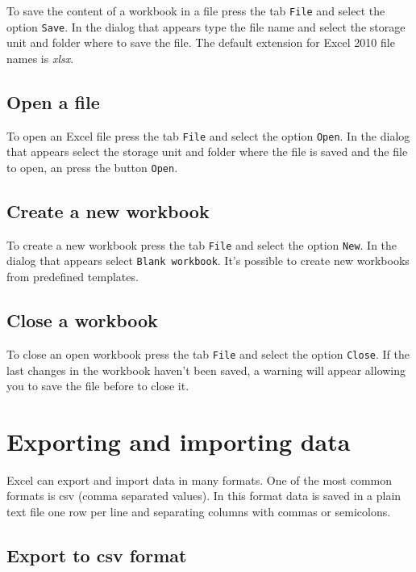 To save the content of a workbook in a file press the tab \texttt{File} and select the option \texttt{Save}. In the dialog that appears type the file name and select the storage unit and folder where to save the file. The default extension for Excel 2010 file names is \emph{xlsx}.

\subsection{Open a file}\hypertarget{open-a-file}{}\label{open-a-file}

To open an Excel file press the tab \texttt{File} and select the option \texttt{Open}.
In the dialog that appears select the storage unit and folder where the file is saved and the file to open, an press the button \texttt{Open}.

\subsection{Create a new workbook}\hypertarget{create-a-new-workbook}{}\label{create-a-new-workbook}

To create a new workbook press the tab \texttt{File} and select the option \texttt{New}. In the dialog that appears select \texttt{Blank workbook}. It's possible to create new workbooks from predefined templates.

\subsection{Close a workbook}\hypertarget{close-a-workbook}{}\label{close-a-workbook}

To close an open workbook press the tab \texttt{File} and select the option \texttt{Close}. If the last changes in the workbook haven't been saved, a warning will appear allowing you to save the file before to close it.

\section{Exporting and importing data}\hypertarget{exporting-and-importing-data}{}\label{exporting-and-importing-data}

Excel can export and import data in many formats. One of the most common formats is csv (comma separated values). In this format data is saved in a plain text file one row per line and separating columns with commas or semicolons.

\subsection{Export to csv format}\hypertarget{export-to-csv-format}{}\label{export-to-csv-format}

